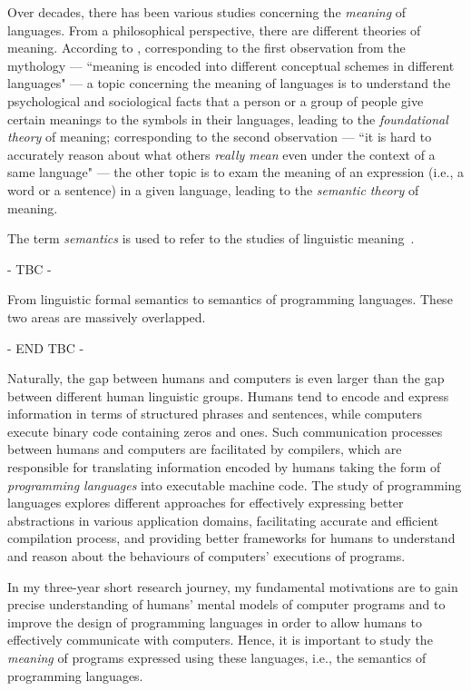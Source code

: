 Over decades, there has been various studies concerning the \emph{meaning} of languages. From a philosophical perspective, there are different theories of meaning. According to \citet{lewis1970}, corresponding to the first observation from the mythology --- ``meaning is encoded into different conceptual schemes in different languages" --- a topic concerning the meaning of languages is to understand the psychological and sociological facts that a person or a group of people give certain meanings to the symbols in their languages, leading to the \emph{foundational theory} of meaning; corresponding to the second observation --- ``it is hard to accurately reason about what others \emph{really mean} even under the context of a same language" --- the other topic is to exam the meaning of an expression (i.e., a word or a sentence) in a given language, leading to the \emph{semantic theory} of meaning.

The term \emph{semantics} is used to refer to the studies of linguistic meaning~\citep{palmer1981semantics}. 

- TBC -

From linguistic formal semantics to semantics of programming languages. These two areas are massively overlapped.

- END TBC -

Naturally, the gap between humans and computers is even larger than the gap between different human linguistic groups. Humans tend to encode and express information in terms of structured phrases and sentences, while computers execute binary code containing zeros and ones. Such communication processes between humans and computers are facilitated by compilers, which are responsible for translating information encoded by humans taking the form of \emph{programming languages} into executable machine code. The study of programming languages explores different approaches for effectively expressing better abstractions in various application domains, facilitating accurate and efficient compilation process, and providing better frameworks for humans to understand and reason about the behaviours of computers' executions of programs.

In my three-year short research journey, my fundamental motivations are to gain precise understanding of humans' mental models of computer programs and to improve the design of programming languages in order to allow humans to effectively communicate with computers. Hence, it is important to study the \emph{meaning} of programs expressed using these languages, i.e., the semantics of programming languages.

